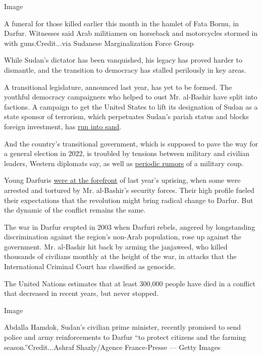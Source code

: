 Image

A funeral for those killed earlier this month in the hamlet of Fata
Bornu, in Darfur. Witnesses said Arab militiamen on horseback and
motorcycles stormed in with guns.Credit...via Sudanese Marginalization
Force Group

While Sudan's dictator has been vanquished, his legacy has proved harder
to dismantle, and the transition to democracy has stalled perilously in
key areas.

A transitional legislature, announced last year, has yet to be formed.
The youthful democracy campaigners who helped to oust Mr. al-Bashir have
split into factions. A campaign to get the United States to lift its
designation of Sudan as a state sponsor of terrorism, which perpetuates
Sudan's pariah status and blocks foreign investment, has
\href{https://www.nytimes3xbfgragh.onion/2020/07/25/us/politics/sudan-compensation-embassy-bombings.html}{run
into sand}.

And the country's transitional government, which is supposed to pave the
way for a general election in 2022, is troubled by tensions between
military and civilian leaders, Western diplomats say, as well as
\href{https://www.nytimes3xbfgragh.onion/2020/04/17/world/africa/Sudan-coup-coronavirus.html}{periodic
rumors} of a military coup.

Young Darfuris
\href{https://www.nytimes3xbfgragh.onion/2019/05/11/world/africa/sudan-darfur-revolution-protest.html}{were
at the forefront} of last year's uprising, when some were arrested and
tortured by Mr. al-Bashir's security forces. Their high profile fueled
their expectations that the revolution might bring radical change to
Darfur. But the dynamic of the conflict remains the same.

The war in Darfur erupted in 2003 when Darfuri rebels, angered by
longstanding discrimination against the region's non-Arab population,
rose up against the government. Mr. al-Bashir hit back by arming the
janjaweed, who killed thousands of civilians monthly at the height of
the war, in attacks that the International Criminal Court has classified
as genocide.

The United Nations estimates that at least 300,000 people have died in a
conflict that decreased in recent years, but never stopped.

Image

Abdalla Hamdok, Sudan's civilian prime minister, recently promised to
send police and army reinforcements to Darfur ``to protect citizens and
the farming season.''Credit...Ashraf Shazly/Agence France-Presse ---
Getty Images

